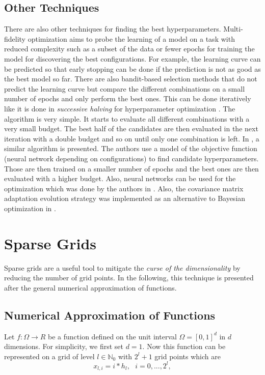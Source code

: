 \subsection{Other Techniques}
There are also other techniques for finding the best hyperparameters. Multi-fidelity optimization \cite{feurer2019hyperparameter} aims to probe the learning of a model on a task with reduced complexity such as a subset of the data or fewer epochs for training the model for discovering the best configurations. For example, the learning curve can be predicted so that early stopping can be done if the prediction is not as good as the best model so far. There are also bandit-based selection methods that do not predict the learning curve but compare the different combinations on a small number of epochs and only perform the best ones. This can be done iteratively like it is done in \textit{successive halving} for hyperparameter optimization \cite{jamieson2016non}. The algorithm is very simple. It starts to evaluate all different combinations with a very small budget. The best half of the candidates are then evaluated in the next iteration with a double budget and so on until only one combination is left. In \cite{8030298}, a similar algorithm is presented. The authors use a model of the objective function (neural network depending on configurations) to find candidate hyperparameters. Those are then trained on a smaller number of epochs and the best ones are then evaluated with a higher budget. Also, neural networks can be used for the optimization which was done by the authors in \cite{smithson2016neural}. Also, the covariance matrix adaptation evolution strategy was implemented as an alternative to Bayesian optimization in \cite{loshchilov2016cma}. 


\section{Sparse Grids}

Sparse grids are a useful tool to mitigate the \textit{curse of the dimensionality} by reducing the number of grid points. In the following, this technique is presented after the general numerical approximation of functions.

\subsection{Numerical Approximation of Functions}

Let $ f: \Omega \rightarrow R $ be a function defined on the unit interval $ \Omega = [0,1]^d $ in $ d $ dimensions. For simplicity, we first set $ d=1$. Now this function can be represented on a grid of level $ l \in \mathbb{N}_0 $ with $ 2^l + 1 $ grid points which are 
\begin{equation}
	x_{l,i} = i*h_l, \text{   } i = 0,...,2^l,
\end{equation}

